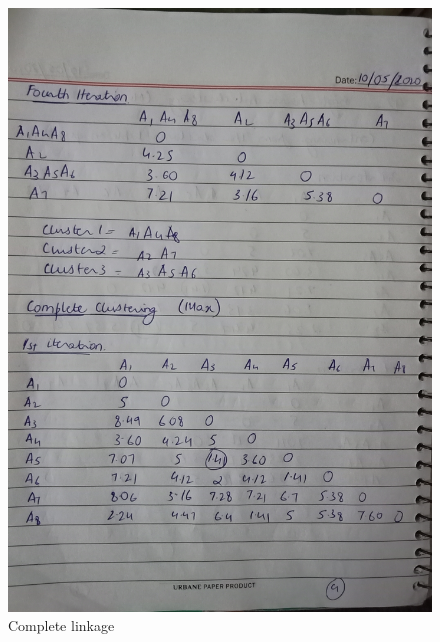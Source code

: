 \documentclass[12pt]{article}
\begin{document}
\begin{figure}
  \includegraphics[width=\linewidth]{4.jpg}
  \caption{Complete linkage}
  \label{pic4}
\end{figure}
\end{document}
